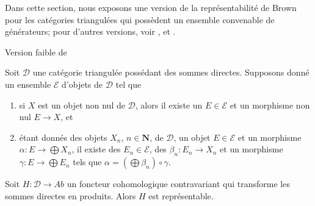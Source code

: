 \noindent
Dans cette section, nous exposons une version de la représentabilité de Brown
pour les catégories triangulées qui possèdent un ensemble convenable de
générateurs; pour d'autres versions, voir \cite{Franke}, \cite{Neeman} et
\cite{Krause}.

\begin{lemma}
\label{lemma-brown-bis}
\begin{reference}
Version faible de \cite[Theorem A]{Krause}
\end{reference}
Soit $\mathcal{D}$ une catégorie triangulée possédant des sommes directes.
Supposons donné un ensemble $\mathcal{E}$ d'objets de $\mathcal{D}$ tel que
\begin{enumerate}
\item si $X$ est un objet non nul de $\mathcal{D}$, alors il existe un
$E \in \mathcal{E}$ et un morphisme non nul $E \to X$, et
\item étant donnés des objets $X_n$, $n \in \mathbf{N}$, de $\mathcal{D}$,
un objet $E \in \mathcal{E}$ et un morphisme
$\alpha : E \to \bigoplus X_n$, il existe des $E_n \in \mathcal{E}$, des
$\beta_n : E_n \to X_n$ et un morphisme
$\gamma : E \to \bigoplus E_n$ tels que
$\alpha = (\bigoplus \beta_n) \circ \gamma$.
\end{enumerate}
Soit $H : \mathcal{D} \to \textit{Ab}$ un foncteur cohomologique contravariant
qui transforme les sommes directes en produits. Alors $H$ est représentable.
\end{lemma}

